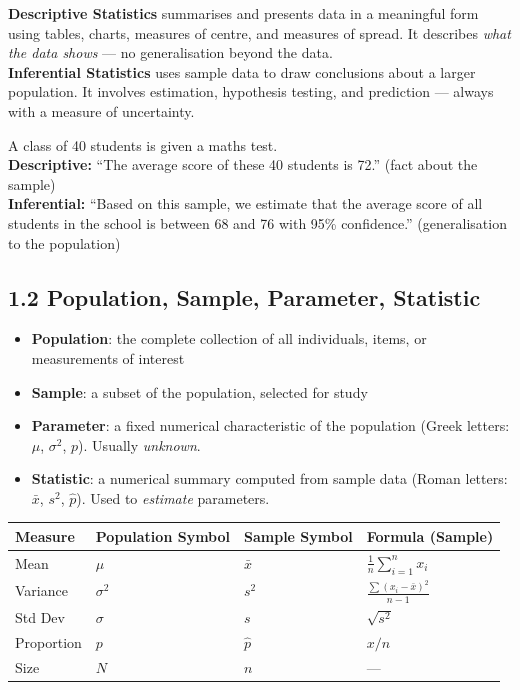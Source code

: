 \documentclass[12pt]{article}
\newcommand{\hcell}[1]{\textbf{\color{white}#1}}
\begin{document}
\begin{defbox}
\textbf{Descriptive Statistics} summarises and presents data in a meaningful form using tables, charts, measures of centre, and measures of spread. It describes \textit{what the data shows} — no generalisation beyond the data.\\[6pt]
\textbf{Inferential Statistics} uses sample data to draw conclusions about a larger population. It involves estimation, hypothesis testing, and prediction — always with a measure of uncertainty.
\end{defbox}

\begin{examplebox}
A class of 40 students is given a maths test.\\[4pt]
\textbf{Descriptive:} ``The average score of these 40 students is 72.'' (fact about the sample)\\
\textbf{Inferential:} ``Based on this sample, we estimate that the average score of all students in the school is between 68 and 76 with 95\% confidence.'' (generalisation to the population)
\end{examplebox}

\subsection{1.2 Population, Sample, Parameter, Statistic}

\begin{defbox}
\begin{itemize}[noitemsep]
  \item \textbf{Population}: the complete collection of all individuals, items, or measurements of interest
  \item \textbf{Sample}: a subset of the population, selected for study
  \item \textbf{Parameter}: a fixed numerical characteristic of the population (Greek letters: $\mu$, $\sigma^2$, $p$). Usually \textit{unknown}.
  \item \textbf{Statistic}: a numerical summary computed from sample data (Roman letters: $\bar{x}$, $s^2$, $\hat{p}$). Used to \textit{estimate} parameters.
\end{itemize}
\end{defbox}

\begin{center}{\small
\begin{tabular}{|l|C{3cm}|C{3cm}|C{3.5cm}|}
\hline{}
\hcell{Measure} & \hcell{Population Symbol} & \hcell{Sample Symbol} & \hcell{Formula (Sample)}\\
\hline Mean & $\mu$ & $\bar{x}$ & $\frac{1}{n}\sum_{i=1}^n x_i$\\\hline
Variance & $\sigma^2$ & $s^2$ & $\frac{\sum(x_i-\bar{x})^2}{n-1}$\\\hline
Std Dev & $\sigma$ & $s$ & $\sqrt{s^2}$\\\hline
Proportion & $p$ & $\hat{p}$ & $x/n$\\\hline
Size & $N$ & $n$ & ---\\\hline
\end{tabular}}
\end{center}
\end{document}
